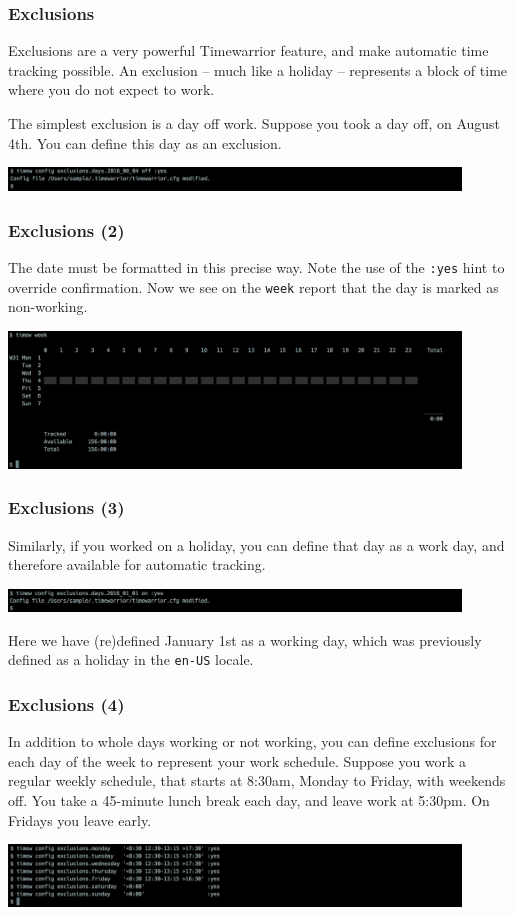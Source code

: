 \documentclass[t,handout]{beamer}
\begin{document}
\begin{frame}[fragile]\frametitle{Exclusions}
    \vfill
    Exclusions are a very powerful Timewarrior feature, and make automatic time tracking possible. An exclusion -- much like a holiday -- represents a block of time where you do not expect to work.

    The simplest exclusion is a day off work. Suppose you took a day off, on August 4th. You can define this day as an exclusion.

    \includegraphics[width=12cm]{images/tutorial30.png}
\end{frame}

\begin{frame}[fragile]\frametitle{Exclusions (2)}
    \vfill
    The date must be formatted in this precise way. Note the use of the \verb=:yes= hint to override confirmation. Now we see on the \verb=week= report that the day is marked as non-working.

    \includegraphics[width=12cm]{images/tutorial31.png}
\end{frame}

\begin{frame}[fragile]\frametitle{Exclusions (3)}
    \vfill
    Similarly, if you worked on a holiday, you can define that day as a work day, and therefore available for automatic tracking.

    \includegraphics[width=12cm]{images/tutorial32.png}

    Here we have (re)defined January 1st as a working day, which was previously defined as a holiday in the \verb=en-US= locale.
\end{frame}

\begin{frame}[fragile]\frametitle{Exclusions (4)}
    \vfill
    In addition to whole days working or not working, you can define exclusions for each day of the week to represent your work schedule. Suppose you work a regular weekly schedule, that starts at 8:30am, Monday to Friday, with weekends off. You take a 45-minute lunch break each day, and leave work at 5:30pm. On Fridays you leave early.

    \includegraphics[width=12cm]{images/tutorial33.png}
\end{frame}
\end{document}
